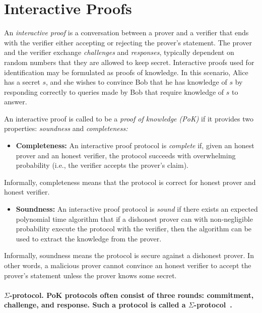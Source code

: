 \documentclass[11pt]{article}
\theoremstyle{plain}
\begin{document}
\section{Interactive Proofs }

An \emph{interactive proof} is a conversation between a prover and
a verifier that ends with the verifier either accepting or rejecting
the prover's statement. The prover and the verifier exchange \emph{challenges}
and \emph{responses}, typically dependent on random numbers that they
are allowed to keep secret. Interactive proofs used for identification
may be formulated as proofs of knowledge. In this scenario, Alice
has a secret $s$, and she wishes to convince Bob that he has knowledge
of $s$ by responding correctly to queries made by Bob that require
knowledge of $s$ to answer.

An interactive proof is called to be a \emph{proof of knowledge (PoK)
}if it provides two properties: \emph{soundness} and \emph{completeness:}
\begin{itemize}
	\item \textbf{Completeness:} An interactive proof protocol is \emph{complete}
	if, given an honest prover and an honest verifier, the protocol succeeds
	with overwhelming probability (i.e., the verifier accepts the prover\textquoteright s
	claim).
\end{itemize}
Informally, completeness means that the protocol is correct for honest
prover and honest verifier.
\begin{itemize}
	\item \textbf{Soundness: }An interactive proof protocol is \emph{sound}
	if there exists an expected polynomial time algorithm that if a dishonest
	prover can with non-negligible probability execute the protocol with
	the verifier, then the algorithm can be used to extract the knowledge
	from the prover.
\end{itemize}
Informally, soundness means the protocol is secure against a dishonest
prover. In other words, a malicious prover cannot convince an honest
verifier to accept the prover's statement unless the prover knows
some secret.

\paragraph{$\Sigma$-protocol. \textmd{PoK protocols often consist of three
		rounds: commitment, challenge, and response. Such a protocol is called
		a $\Sigma$-protocol}~\cite{sigma:protocols:damgard}.}
\end{document}
